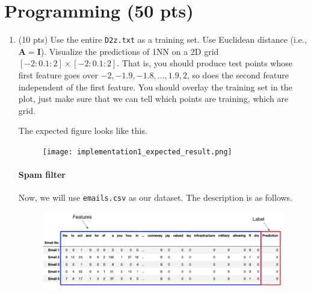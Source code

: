 \documentclass[a4paper]{article}
\theoremstyle{definition}
\renewcommand\vec[1]{\mathbf{#1}}
\begin{document}
\section{Programming (50 pts)}
\begin{enumerate}
	\item (10 pts) Use the entire {\tt D2z.txt} as a training set.  Use Euclidean distance (i.e., $\vec A=\vec I$).
	Visualize the predictions of 1NN on a 2D grid $[-2:0.1:2]\times [-2:0.1:2]$.
	That is, you should produce test points whose first feature goes over $-2, -1.9, -1.8, \ldots, 1.9, 2$, so does the second feature independent of the first feature.
	You should overlay the training set in the plot, just make sure that we can tell which points are training, which are grid.
	
	The expected figure looks like this.
	\begin{figure}[h]
		\centering
		\texttt{[image: implementation1\_expected\_result.png]}
	\end{figure}
	
	\paragraph{Spam filter} Now, we will use {\tt emails.csv} as our dataset. The description is as follows.
	\begin{figure}[h]
		\centering
		\includegraphics[width=18cm]{email_head.png}
	\end{figure}
	

\end{enumerate}
\end{document}
